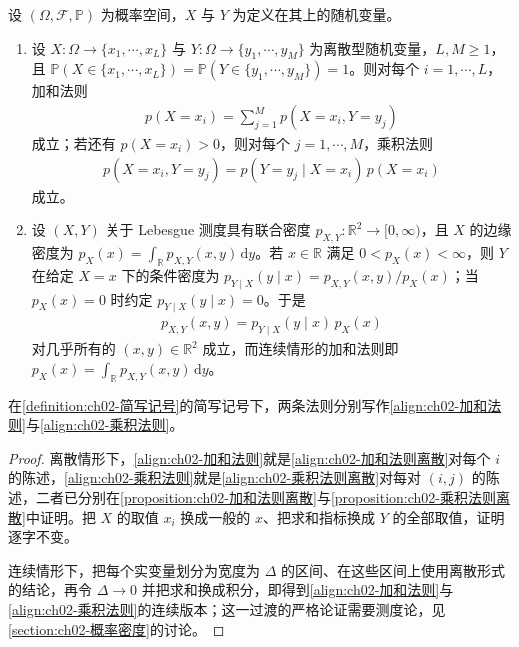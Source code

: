 \documentclass[../../main.tex]{subfiles}
\begin{document}
\begin{theorem}[概率论的两个基本法则]\label{theorem:ch02-两个基本法则}
设 $(\Omega,\mathcal{F},\mathbb{P})$ 为概率空间，$X$ 与 $Y$ 为定义在其上的随机变量。
\begin{enumerate}
  \item 设 $X:\Omega\to\{x_1,\cdots,x_L\}$ 与 $Y:\Omega\to\{y_1,\cdots,y_M\}$ 为离散型随机变量，$L,M\geqslant1$，且 $\mathbb{P}(X\in\{x_1,\cdots,x_L\})=\mathbb{P}(Y\in\{y_1,\cdots,y_M\})=1$。则对每个 $i=1,\cdots,L$，加和法则
  \begin{align*}
    p(X=x_i)=\sum_{j=1}^{M}p(X=x_i,Y=y_j)
  \end{align*}
  成立；若还有 $p(X=x_i)>0$，则对每个 $j=1,\cdots,M$，乘积法则
  \begin{align*}
    p(X=x_i,Y=y_j)=p(Y=y_j\mid X=x_i)\,p(X=x_i)
  \end{align*}
  成立。
  \item 设 $(X,Y)$ 关于 Lebesgue 测度具有联合密度 $p_{X,Y}:\mathbb{R}^{2}\to[0,\infty)$，且 $X$ 的边缘密度为 $p_X(x)=\int_{\mathbb{R}}p_{X,Y}(x,y)\,\mathrm{d}y$。若 $x\in\mathbb{R}$ 满足 $0<p_X(x)<\infty$，则 $Y$ 在给定 $X=x$ 下的条件密度为 $p_{Y\mid X}(y\mid x)=p_{X,Y}(x,y)/p_X(x)$；当 $p_X(x)=0$ 时约定 $p_{Y\mid X}(y\mid x)=0$。于是
  \begin{align*}
    p_{X,Y}(x,y)=p_{Y\mid X}(y\mid x)\,p_X(x)
  \end{align*}
  对几乎所有的 $(x,y)\in\mathbb{R}^{2}$ 成立，而连续情形的加和法则即 $p_X(x)=\int_{\mathbb{R}}p_{X,Y}(x,y)\,\mathrm{d}y$。
\end{enumerate}
在\cref{definition:ch02-简写记号}的简写记号下，两条法则分别写作\eqref{align:ch02-加和法则}与\eqref{align:ch02-乘积法则}。
\end{theorem}

\begin{proof}
离散情形下，\eqref{align:ch02-加和法则}就是\eqref{align:ch02-加和法则离散}对每个 $i$ 的陈述，\eqref{align:ch02-乘积法则}就是\eqref{align:ch02-乘积法则离散}对每对 $(i,j)$ 的陈述，二者已分别在\cref{proposition:ch02-加和法则离散}与\cref{proposition:ch02-乘积法则离散}中证明。把 $X$ 的取值 $x_i$ 换成一般的 $x$、把求和指标换成 $Y$ 的全部取值，证明逐字不变。

连续情形下，把每个实变量划分为宽度为 $\Delta$ 的区间、在这些区间上使用离散形式的结论，再令 $\Delta\to0$ 并把求和换成积分，即得到\eqref{align:ch02-加和法则}与\eqref{align:ch02-乘积法则}的连续版本；这一过渡的严格论证需要测度论，见\cref{section:ch02-概率密度}的讨论。
\end{proof}
\end{document}
